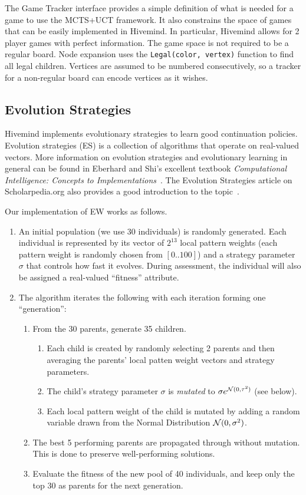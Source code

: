 \documentclass{acm_proc_article-sp}
\begin{document}
The Game Tracker interface provides a simple definition of what is needed for a game to use the MCTS+UCT framework. It also constrains the space of games that can be easily implemented in Hivemind. 
In particular, Hivemind allows for 2 player games with perfect information. 
The game space is not required to be a regular board. 
Node expansion uses the \texttt{Legal(color, vertex)} function to find all legal children. Vertices are assumed to be numbered consecutively, so a tracker for a non-regular board can encode vertices as it wishes.

\subsection{Evolution Strategies}\label{s:es}

Hivemind implements evolutionary strategies to learn good continuation policies.
Evolution strategies (ES) is a collection of algorithms that operate on real-valued vectors. 
More information on evolution strategies and evolutionary learning in general can be found in Eberhard and Shi's excellent textbook \emph{Computational Intelligence: Concepts to Implementations}~\cite{eberhart2007computational}. 
The Evolution Strategies article on Scholarpedia.org also provides a good introduction to the topic~\cite{Beyer:2007}.

Our implementation of EW works as follows.
\begin{enumerate}
\item An initial population (we use 30 individuals) is randomly generated. 
Each individual is represented by its vector of $2^{13}$ local pattern weights 
(each pattern weight is randomly chosen from $[0 .. 100]$)
and a strategy parameter $\sigma$ that controls how fast it evolves.
During assessment, the individual will also be assigned a real-valued ``fitness'' attribute.
\item The algorithm iterates the following with each iteration forming one ``generation'':
	\begin{enumerate}
	\item From the 30 parents, generate 35 children.
		\begin{enumerate}
		\item Each child is created by randomly selecting 2 parents and then 
		averaging the parents' local patten weight vectors and strategy parameters.
		\item	The child's strategy parameter $\sigma$ is \emph{mutated} to $\sigma e^{ {\cal N}(0,\tau^2)}$
			(see below).
		\item Each local pattern weight of the child is mutated by adding a random variable drawn from the Normal Distribution
		${\cal N}(0, \sigma^2)$.
		\end{enumerate}
	\item The best 5 performing parents are propagated through without mutation.  This is done to preserve well-performing solutions.
	\item Evaluate the fitness of the new pool of 40 individuals, and keep only the top 30 as parents for the next generation.
	\end{enumerate}
\end{enumerate}
\end{document}

